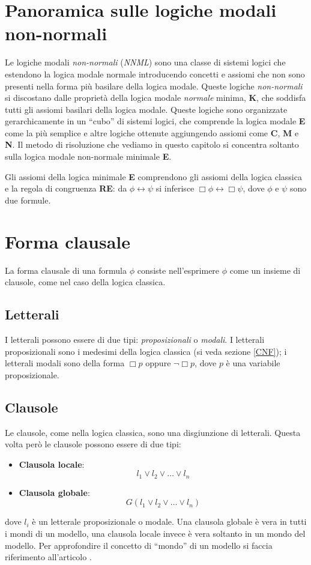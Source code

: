 \documentclass[a4paper,12pt]{report}
\newcommand{\tto} {\leftrightarrow}
\begin{document}
\section{Panoramica sulle logiche modali non-normali}
Le logiche modali \emph{non-normali} (\emph{NNML}) sono una classe di sistemi logici che estendono la logica modale normale introducendo concetti e assiomi che non sono presenti nella forma più basilare della logica modale. Queste logiche \emph{non-normali} si discostano dalle proprietà della logica modale \emph{normale} minima, \textbf{K}, che soddisfa tutti gli assiomi basilari della logica modale. Queste logiche sono organizzate gerarchicamente in un ``cubo'' di sistemi logici, che comprende la logica modale \textbf{E} come la più semplice e altre logiche ottenute aggiungendo assiomi come \textbf{C}, \textbf{M} e \textbf{N}. Il metodo di risoluzione che vediamo in questo capitolo si concentra soltanto sulla logica modale non-normale minimale \textbf{E}.

Gli assiomi della logica minimale \textbf{E} comprendono gli assiomi della logica classica e la regola di congruenza \textbf{RE}: da $\phi \tto \psi$ si inferisce $\Box \phi \tto \Box \psi$, dove $\phi$ e $\psi$ sono due formule.

\section{Forma clausale}
La forma clausale di una formula $\phi$ consiste nell'esprimere $\phi$ come un insieme di clausole, come nel caso della logica classica.
\subsection*{Letterali}
I letterali possono essere di due tipi: \emph{proposizionali} o \emph{modali}. I letterali proposizionali sono i medesimi della logica classica (si veda sezione \ref{CNF}); i letterali modali sono della forma $\Box p$ oppure $\lnot \Box p$, dove $p$ è una variabile proposizionale.
\subsection*{Clausole}
Le clausole, come nella logica classica, sono una disgiunzione di letterali. Questa volta però le clausole possono essere di due tipi: 
\begin{itemize}
    \item \textbf{Clausola locale}: \[ l_1 \lor l_2 \lor \ldots \lor l_n \]
    \item \textbf{Clausola globale}: \[ G(l_1 \lor l_2 \lor \ldots \lor l_n) \]
\end{itemize}
dove $l_i$ è un letterale proposizionale o modale. Una clausola globale è vera in tutti i mondi di un modello, una clausola locale invece è vera soltanto in un mondo del modello. Per approfondire il concetto di ``mondo'' di un modello si faccia riferimento all'articolo \cite{Articolo_resolution}.
\end{document}
